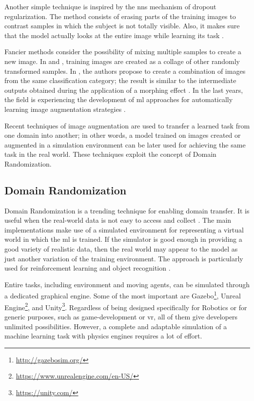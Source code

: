 Another simple technique is inspired by the \gls{nn}s mechanism of dropout regularization. The method consists of erasing parts of the training images to contrast samples in which the subject is not totally visible. Also, it makes sure that the model actually looks at the entire image while learning its task \cite{wan2013dropconn} \cite{zhong2017random}. 

Fancier methods consider the possibility of mixing multiple samples to create a new image. In \cite{Takahashi_2020} and \cite{summers2019improved}, training images are created as a collage of other randomly transformed samples. In \cite{Lemley_2017}, the authors propose to create a combination of images from the same classification category; the result is similar to the intermediate outputs obtained during the application of a morphing effect \cite{wiki_morphing}. In the last years, the field is experiencing the development of \gls{ml} approaches for automatically learning image augmentation strategies \cite{zoph2019learning} \cite{cubuk2019autoaugment}.

Recent techniques of image augmentation are used to transfer a learned task from one domain into another; in other words, a model trained on images created or augmented in a simulation environment can be later used for achieving the same task in the real world. These techniques exploit the concept of Domain Randomization.



\subsection{Domain Randomization}
\label{subsec:domain-randomization}

Domain Randomization is a trending technique for enabling domain transfer. It is useful when the real-world data is not easy to access and collect \cite{mehta2019active}. The main implementations make use of a simulated environment for representing a virtual world in which the \gls{ml} is trained. If the simulator is good enough in providing a good variety of realistic data, then the real world may appear to the model as just another variation of the training environment. The approach is particularly used for reinforcement learning \cite{imitation_learning_3d_navigation} and object recognition \cite{weng2019DR} \cite{tobin2017domain}.

Entire tasks, including environment and moving agents, can be simulated through a dedicated graphical engine. Some of the most important are Gazebo\footnote{\url{http://gazebosim.org/}}, Unreal Engine\footnote{\url{https://www.unrealengine.com/en-US/}}, and Unity\footnote{\url{https://unity.com/}}. Regardless of being designed specifically for Robotics or for generic purposes, such as game-development or \gls{vr}, all of them give developers unlimited possibilities. However, a complete and adaptable simulation of a machine learning task with physics engines requires a lot of effort.

